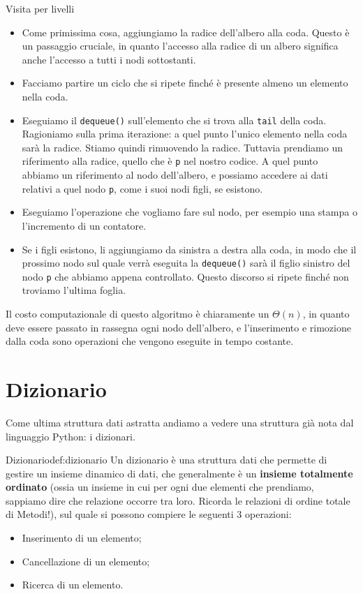 \documentclass[12pt]{report}
\begin{document}
	\begin{algoritmo}{Visita per livelli}{}
		\begin{itemize}
			\item Come primissima cosa, aggiungiamo la radice dell'albero alla coda. Questo è un passaggio cruciale, in quanto l'accesso alla radice di un albero significa anche l'accesso a tutti i nodi sottostanti.
			\item Facciamo partire un ciclo che si ripete finché è presente almeno un elemento nella coda.
			\item Eseguiamo il \texttt{dequeue()} sull'elemento che si trova alla \texttt{tail} della coda. Ragioniamo sulla prima iterazione: a quel punto l'unico elemento nella coda sarà la radice. Stiamo quindi rimuovendo la radice. Tuttavia prendiamo un riferimento alla radice, quello che è \texttt{p} nel nostro codice. A quel punto abbiamo un riferimento al nodo dell'albero, e possiamo accedere ai dati relativi a quel nodo \texttt{p}, come i suoi nodi figli, se esistono.
			\item Eseguiamo l'operazione che vogliamo fare sul nodo, per esempio una stampa o l'incremento di un contatore.
			\item Se i figli esistono, li aggiungiamo da sinistra a destra alla coda, in modo che il prossimo nodo sul quale verrà eseguita la \texttt{dequeue()} sarà il figlio sinistro del nodo \texttt{p} che abbiamo appena controllato. Questo discorso si ripete finché non troviamo l'ultima foglia.
		\end{itemize}
	\end{algoritmo}
	
	Il costo computazionale di questo algoritmo è chiaramente un $\Theta(n)$, in quanto deve essere passato in rassegna ogni nodo dell'albero, e l'inserimento e rimozione dalla coda sono operazioni che vengono eseguite in tempo costante.
	
	\newpage
	\section{Dizionario}
	Come ultima struttura dati astratta andiamo a vedere una struttura già nota dal linguaggio Python: i dizionari.
	
	\begin{definizione}{Dizionario}{def:dizionario}
		Un dizionario è una struttura dati che permette di gestire un insieme dinamico di dati, che generalmente è un \textbf{insieme totalmente ordinato} (ossia un insieme in cui per ogni due elementi che prendiamo, sappiamo dire che relazione occorre tra loro. Ricorda le relazioni di ordine totale di Metodi!), sul quale si possono compiere le seguenti 3 operazioni:
		\begin{itemize}
			\item Inserimento di un elemento;
			\item Cancellazione di un elemento;
			\item Ricerca di un elemento.
		\end{itemize}
	\end{definizione}
	
\end{document}
